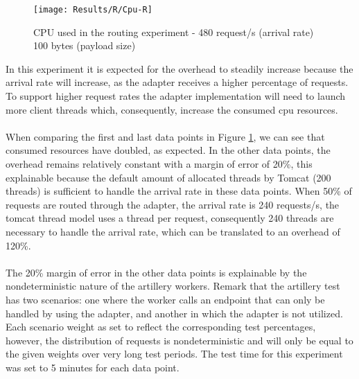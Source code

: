 \begin{figure}[htbp]
    \centering
    \texttt{[image: Results/R/Cpu-R]}
    \caption{CPU used in the routing experiment - 480 request/s (arrival rate) 100 bytes (payload size)}
    \label{fig:routCpu}
\end{figure}

In this experiment it is expected for the overhead to steadily increase because the arrival rate will increase, as the adapter receives a higher percentage of requests. To support higher request rates
the adapter implementation will need to launch more client threads which, consequently, increase the consumed cpu resources.
    
\paragraph{}

When comparing the first and last data points in Figure \ref{fig:routCpu}, we can see that consumed resources have doubled, as expected.
In the other data points, the overhead remains relatively constant with a margin of error of 20\%,
this explainable because the default amount of allocated threads by Tomcat (200 threads) is sufficient to handle the arrival rate in these data points.
When 50\% of requests are routed through the adapter, the arrival rate is 240 requests/s, the tomcat thread model uses a thread per request,
consequently 240 threads are necessary to handle the arrival rate, which can be translated to an overhead of 120\%.

\paragraph{}

The 20\% margin of error in the other data points is explainable by the nondeterministic nature of the artillery workers.
Remark that the artillery test has two scenarios: one where the worker calls an endpoint that can only be handled by using the adapter, and another in which the adapter is not utilized.
Each scenario weight as set to reflect the corresponding test percentages,
however, the distribution of requests is nondeterministic and will only be equal to the given weights over very long test periods.
The test time for this experiment was set to 5 minutes for each data point.

\paragraph{}

